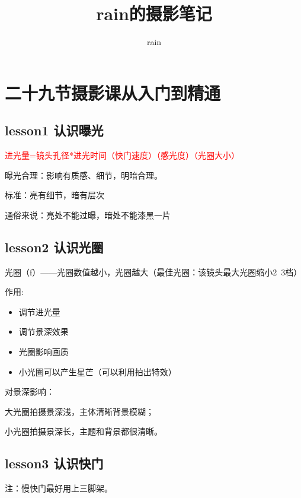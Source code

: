 \documentclass{book}
\begin{document}
\title{rain的摄影笔记}

\author{rain}

\maketitle

\tableofcontents%

\newpage
\section{二十九节摄影课从入门到精通}

\subsection{lesson1 认识曝光}

\textcolor{red}{进光量=镜头孔径*进光时间（快门速度）（感光度）（光圈大小）}

曝光合理：影响有质感、细节，明暗合理。

标准：亮有细节，暗有层次

通俗来说：亮处不能过曝，暗处不能漆黑一片
\subsection{lesson2 认识光圈}

光圈（f）——光圈数值越小，光圈越大（最佳光圈：该镜头最大光圈缩小2~3档）

作用:\begin{itemize}
  \item 调节进光量
  \item 调节景深效果
  \item 光圈影响画质
  \item 小光圈可以产生星芒（可以利用拍出特效）
\end{itemize}

对景深影响：

大光圈拍摄景深浅，主体清晰背景模糊；

小光圈拍摄景深长，主题和背景都很清晰。
\subsection{lesson3 认识快门}

注：慢快门最好用上三脚架。
\end{document}
